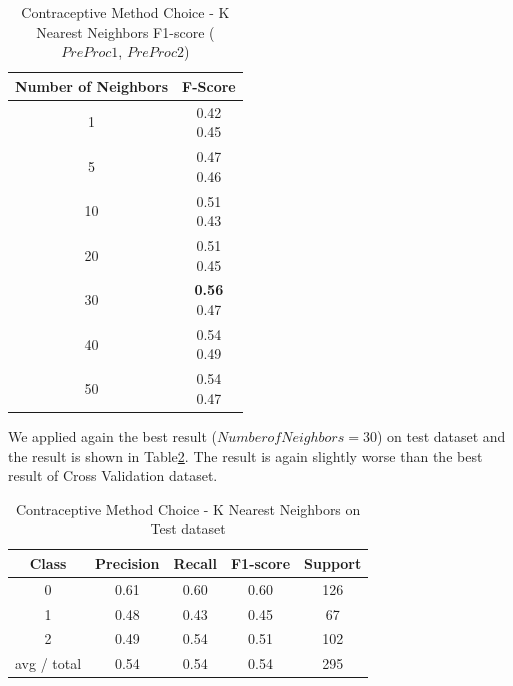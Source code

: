 \begin{table}[p]
\begin{center}
\begin{tabular}{|c|c|}
\hline Number of Neighbors & F-Score \\

\hline 1 & \minibox{0.42\\ 0.45} \\
\hline 5 & \minibox{0.47\\ 0.46} \\
\hline 10 & \minibox{0.51\\ 0.43} \\
\hline 20 & \minibox{0.51\\ 0.45} \\
\hline 30 & \minibox{\textbf{0.56}\\ 0.47} \\
\hline 40 & \minibox{0.54\\ 0.49} \\
\hline 50 & \minibox{0.54\\ 0.47} \\

\hline
\end{tabular}

\caption{Contraceptive Method Choice - K Nearest Neighbors  F1-score ($PreProc1$, $PreProc2$)}
\label{table:db1-knn}
\end{center}
\end{table}

We applied again the best result ($Number of Neighbors=30$) on test dataset and the result is shown in Table\ref{table:db1-knn-test}. The result is again slightly worse than the best result of Cross Validation dataset.


\begin{table}[p]
\begin{center}
\begin{tabular}{|c|c|c|c|c|}
\hline Class & Precision & Recall & F1-score & Support \\

\hline 0 & 0.61 & 0.60 & 0.60 & 126\\
\hline 1 & 0.48 & 0.43 & 0.45 & 67\\
\hline 2 & 0.49 & 0.54 & 0.51 & 102\\
\hline avg / total & 0.54 & 0.54 & 0.54 & 295\\
\hline
\end{tabular}

\caption{Contraceptive Method Choice - K Nearest Neighbors on Test dataset}
\label{table:db1-knn-test}
\end{center}
\end{table}

